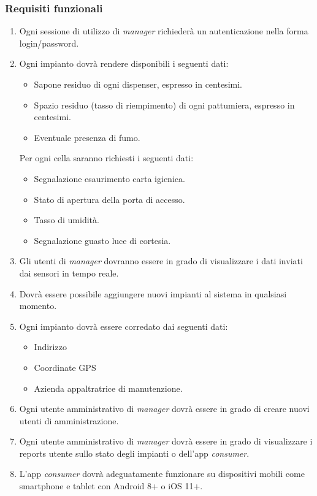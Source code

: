 \documentclass[12pt]{article}
\begin{document}
\subsubsection{Requisiti funzionali}
\begin{enumerate}

\item Ogni sessione di utilizzo di \textit{manager} richiederà un autenticazione nella forma login/password.
\item Ogni impianto dovrà rendere disponibili i seguenti dati:
\begin{itemize}
\item Sapone residuo di ogni dispenser, espresso in centesimi.
\item Spazio residuo (tasso di riempimento) di ogni pattumiera, espresso in centesimi.
\item Eventuale presenza di fumo.
\end{itemize}
Per ogni cella saranno richiesti i seguenti dati:
\begin{itemize}
\item Segnalazione esaurimento carta igienica.
\item Stato di apertura della porta di accesso.
\item Tasso di umidità.
\item Segnalazione guasto luce di cortesia.
\end{itemize}
\item Gli utenti di \textit{manager} dovranno essere in grado di visualizzare i dati inviati dai sensori in tempo reale.
\item Dovrà essere possibile aggiungere nuovi impianti al sistema in qualsiasi momento.
\item Ogni impianto dovrà essere corredato dai seguenti dati:
\begin{itemize}
\item Indirizzo
\item Coordinate GPS
\item Azienda appaltratrice di manutenzione.
\end{itemize}
\item Ogni utente amministrativo di \textit{manager} dovrà essere in grado di creare nuovi utenti di amministrazione.
\item Ogni utente amministrativo di \textit{manager} dovrà essere in grado di visualizzare i reports utente sullo stato degli impianti o dell'app \textit{consumer}.
\item L'app \textit{consumer} dovrà adeguatamente funzionare su dispositivi mobili come smartphone e tablet con Android 8+ o iOS 11+.

\end{enumerate}
\end{document}
